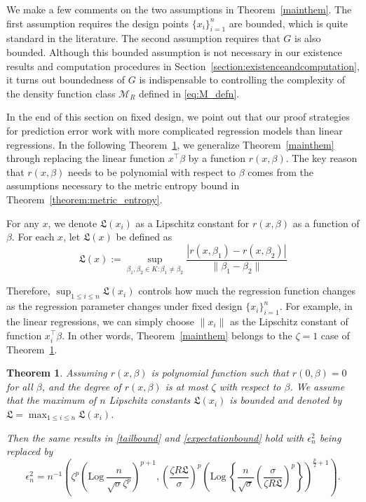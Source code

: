 \documentclass[11pt]{article}
\numberwithin{equation}{section}
\newtheorem{theorem}{Theorem}[section]
\newcommand{\T}{ \top }
\newcommand{\lipsz}{\mathfrak{L}}
\newcommand{\Log}{\mathrm{Log}~}
\begin{document}
We make a few comments on the two assumptions in Theorem~\ref{mainthem}. The first assumption requires the design points $\{x_i\}_{i=1}^n$ are bounded, which is quite standard in the literature. The second assumption requires that $G$ is also bounded. Although this bounded assumption is not necessary in our existence results and computation procedures in Section~\ref{section:existenceandcomputation},
it turns out boundedness of $G$ is indispensable to controlling the complexity of the density function class $\mathcal{M}_R$ defined in \eqref{eq:M_defn}. 


In the end of this section on fixed design, we point out that our proof strategies for prediction error work with more complicated regression models than linear regressions. In the following Theorem~\ref{mainthem:poly}, we generalize Theorem~\ref{mainthem} through replacing the linear function $x^\T \beta$ by a function $r(x,\beta)$. The key reason that $r(x,\beta)$ needs to be polynomial with respect to $\beta$ comes from the assumptions necessary to the metric entropy bound in Theorem~\ref{theorem:metric_entropy}. 

For any $x$, we denote $\lipsz(x_i)$ as a Lipschitz constant for $r(x,\beta)$ as a function of $\beta$. For each $x$, let $ \lipsz(x)$ be defined as
\begin{equation}
  \lipsz(x) := \sup_{\beta_1, \beta_2 \in K : \beta_1 \neq \beta_2} \frac{\left|r(x, \beta_1) - r(x, \beta_2) \right|}{\|\beta_1 - \beta_2\|} 
  \label{eq:lipsz_defn}
\end{equation}

Therefore, $\sup_{1\leq i \leq n} \lipsz(x_i)$ controls how much the regression function changes as the regression parameter changes under fixed design $\{x_i\}_{i=1}^n$. For example, in the linear regressions, we can simply choose $\| x_i \|$ as the Lipschitz constant of function $x_i^\T \beta$. In other words, Theorem~\ref{mainthem} belongs to the $\zeta = 1$ case of Theorem~\ref{mainthem:poly}.

\begin{theorem}
Assuming $r(x,\beta)$ is polynomial function such that $r(0,\beta) = 0$ for all $\beta$, and the degree of $r(x,\beta)$ is at most $\zeta$ with respect to $\beta$. We assume that the maximum of $n$ Lipschitz constants $\lipsz(x_i)$ is bounded and denoted by $\lipsz = \max_{1\leq i \leq n}\lipsz (x_i)$.

Then the same results in \eqref{tailbound} and \eqref{expectationbound} hold with $\epsilon_n^2$ being replaced by
\[
\epsilon^2_n =n^{-1} \left(\zeta^p\left(\Log  \frac{n}{\sqrt{\sigma}\zeta^p} \right)^{p+1} , \left(\frac{\zeta R \lipsz}{\sigma} \right)^p \left(\Log \left\{\frac{n}{\sqrt{\sigma}} \left(\frac{\sigma}{\zeta R \lipsz} \right)^p \right\} \right)^{\frac{p}{2} + 1}  \right).
\]

\label{mainthem:poly}
\end{theorem}
\end{document}
